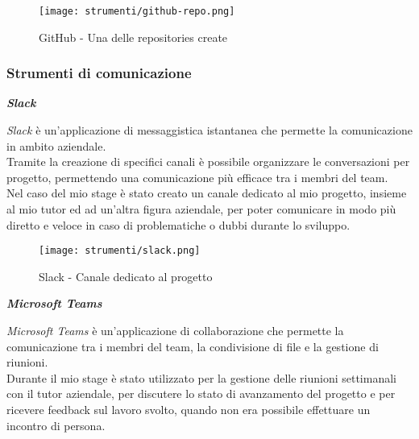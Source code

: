 \begin{figure}[H]
    \label{fig:github} 
    \centering
    \texttt{[image: strumenti/github-repo.png]}
    \caption{GitHub - Una delle repositories create}
\end{figure}

\pagebreak
\subsubsection{Strumenti di comunicazione}
\label{sez:strumenti-comunicazione}


\noindent \textbf{\textit{Slack\\}}

\noindent \textit{Slack} è un'applicazione di messaggistica istantanea che permette la comunicazione in ambito aziendale. \\
Tramite la creazione di specifici canali è possibile organizzare le conversazioni per progetto, permettendo una comunicazione più efficace tra i membri del team.\\
Nel caso del mio stage è stato creato un canale dedicato al mio progetto, insieme al mio tutor ed ad un'altra figura aziendale, per poter comunicare in modo più diretto e veloce 
in caso di problematiche o dubbi durante lo sviluppo.

\begin{figure}[H]
    \label{fig:slack} 
    \centering
    \texttt{[image: strumenti/slack.png]}
    \caption{Slack - Canale dedicato al progetto}
\end{figure}

\noindent \textbf{\textit{Microsoft Teams\\}}

\noindent \textit{Microsoft Teams} è un'applicazione di collaborazione che permette la comunicazione tra i membri del team, la condivisione di file e la gestione di riunioni.\\
Durante il mio stage è stato utilizzato per la gestione delle riunioni settimanali con il tutor aziendale, per discutere lo stato di avanzamento del progetto e per ricevere feedback sul lavoro svolto, quando
non era possibile effettuare un incontro di persona.
